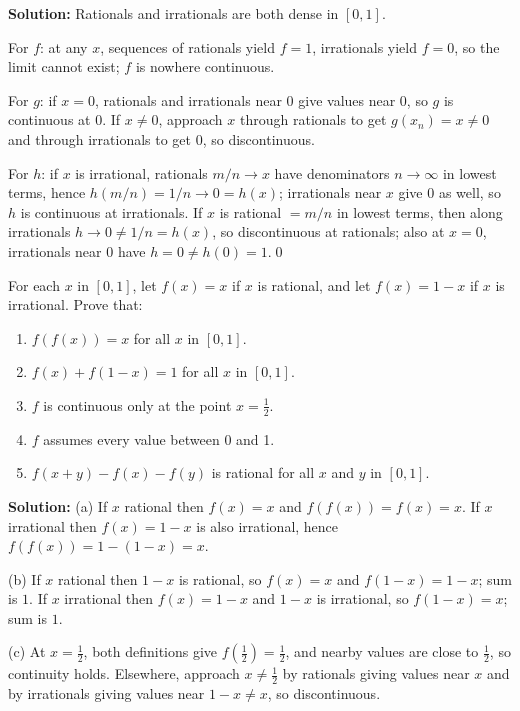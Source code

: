 \noindent\textbf{Solution:}
Rationals and irrationals are both dense in $[0,1]$.

For $f$: at any $x$, sequences of rationals yield $f=1$, irrationals yield $f=0$, so the limit cannot exist; $f$ is nowhere continuous.

For $g$: if $x=0$, rationals and irrationals near $0$ give values near $0$, so $g$ is continuous at $0$. If $x\ne0$, approach $x$ through rationals to get $g(x_n)=x\ne 0$ and through irrationals to get $0$, so discontinuous.

For $h$: if $x$ is irrational, rationals $m/n\to x$ have denominators $n\to\infty$ in lowest terms, hence $h(m/n)=1/n\to 0=h(x)$; irrationals near $x$ give $0$ as well, so $h$ is continuous at irrationals. If $x$ is rational $=m/n$ in lowest terms, then along irrationals $h\to 0\ne 1/n=h(x)$, so discontinuous at rationals; also at $x=0$, irrationals near $0$ have $h=0\ne h(0)=1$.\qed



\begin{problembox}
For each \( x \) in \([0, 1]\), let \( f(x) = x \) if \( x \) is rational, and let \( f(x) = 1 - x \) if \( x \) is irrational. Prove that:
\begin{enumerate}[label=(\alph*)]
\item \( f(f(x)) = x \) for all \( x \) in \([0, 1]\).
\item \( f(x) + f(1 - x) = 1 \) for all \( x \) in \([0, 1]\).
\item \( f \) is continuous only at the point \( x = \frac{1}{2} \).
\item \( f \) assumes every value between 0 and 1.
\item \( f(x + y) - f(x) - f(y) \) is rational for all \( x \) and \( y \) in \([0, 1]\).
\end{enumerate}
\end{problembox}

\noindent\textbf{Solution:}
(a) If $x$ rational then $f(x)=x$ and $f(f(x))=f(x)=x$. If $x$ irrational then $f(x)=1-x$ is also irrational, hence $f(f(x))=1-(1-x)=x$.

(b) If $x$ rational then $1-x$ is rational, so $f(x)=x$ and $f(1-x)=1-x$; sum is $1$. If $x$ irrational then $f(x)=1-x$ and $1-x$ is irrational, so $f(1-x)=x$; sum is $1$.

(c) At $x=\tfrac12$, both definitions give $f(\tfrac12)=\tfrac12$, and nearby values are close to $\tfrac12$, so continuity holds. Elsewhere, approach $x\ne\tfrac12$ by rationals giving values near $x$ and by irrationals giving values near $1-x\ne x$, so discontinuous.

